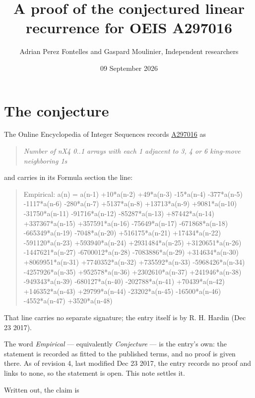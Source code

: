 \documentclass[11pt]{article}
\title{A proof of the conjectured linear recurrence for OEIS A297016}
\author{Adrian Perez Fontelles and Gaspard Moulinier, Independent researchers}
\date{09 September 2026}
\theoremstyle{definition}
\begin{document}
\maketitle
\section{The conjecture}

The Online Encyclopedia of Integer Sequences records \href{https://oeis.org/A297016}{A297016} as

\begin{quote}\itshape Number of nX4 0..1 arrays with each 1 adjacent to 3, 4 or 6 king-move neighboring 1s\end{quote}

and carries in its Formula section the line:

\begin{quote}\ttfamily Empirical: a(n) = a(n-1) +10*a(n-2) +49*a(n-3) -15*a(n-4) -377*a(n-5) -1117*a(n-6) -280*a(n-7) +5137*a(n-8) +13713*a(n-9) +9081*a(n-10) -31750*a(n-11) -91716*a(n-12) -85287*a(n-13) +87442*a(n-14) +337367*a(n-15) +357591*a(n-16) -75649*a(n-17) -671868*a(n-18) -665349*a(n-19) -7048*a(n-20) +516175*a(n-21) +17434*a(n-22) -591120*a(n-23) +593940*a(n-24) +2931484*a(n-25) +3120651*a(n-26) -1447621*a(n-27) -6700012*a(n-28) -7083886*a(n-29) +314634*a(n-30) +8069951*a(n-31) +7740352*a(n-32) +735592*a(n-33) -5968426*a(n-34) -4257926*a(n-35) +952578*a(n-36) +2302610*a(n-37) +241946*a(n-38) -949343*a(n-39) -680127*a(n-40) -202788*a(n-41) +70439*a(n-42) +146352*a(n-43) +29799*a(n-44) -23202*a(n-45) -16500*a(n-46) -4552*a(n-47) +3520*a(n-48)\end{quote}

That line carries no separate signature; the entry itself is by R. H. Hardin (Dec 23 2017).

The word {\itshape Empirical} --- equivalently {\itshape Conjecture} --- is the entry's own: the statement is recorded as fitted to the published terms, and no proof is given there. As of revision 4, last modified Dec 23 2017, the entry records no proof and links to none, so the statement is open. This note settles it.

Written out, the claim is
\end{document}
